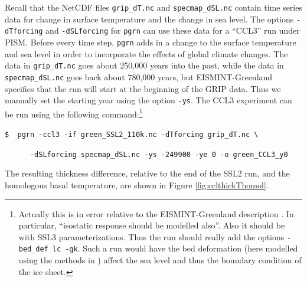 \documentclass[11pt,final]{amsart}
\newcommand{\und}{$\underline{\,\,\,}$}
\begin{document}
Recall that the NetCDF files \verb|grip_dT.nc| and \verb|specmap_dSL.nc| contain time series data for change in surface temperature and the change in sea level.  The options \verb|-dTforcing| and \verb|-dSLforcing| for \verb|pgrn| can use these data for a ``CCL3'' run \cite{RitzEISMINT} under PISM.  Before every time step, \verb|pgrn| adds in a change to the surface temperature and sea level in order to incorporate the effects of global climate changes.  The data in \verb|grip_dT.nc| goes about 250,000 years into the past, while the data in \verb|specmap_dSL.nc| goes back about 780,000 years, but EISMINT-Greenland specifies that the run will start at the beginning of the GRIP data.  Thus we manually set the starting year using the option \verb|-ys|.  The CCL3 experiment can be run using the following command:\footnote{Actually this is in error relative to the EISMINT-Greenland description \cite{RitzEISMINT,HuybrechtsEISMINT}.  In particular, ``isostatic response should be modelled also''.  Also it should be with SSL3 parameterizations.  Thus the run should really add the options \texttt{-bed\und def\und lc -gk}.  Such a run would have the bed deformation (here modelled using the methods in \cite{BLKfastearth,LingleClark}) affect the sea level and thus the boundary condition of the ice sheet.}

\verb|$  pgrn -ccl3 -if green_SSL2_110k.nc -dTforcing grip_dT.nc \|

\verb|      -dSLforcing specmap_dSL.nc -ys -249900 -ye 0 -o green_CCL3_y0|

The resulting thickness difference, relative to the end of the SSL2 run, and the homologous basal temperature, are shown in Figure \ref{fig:cclthickThomol}.
\end{document}
